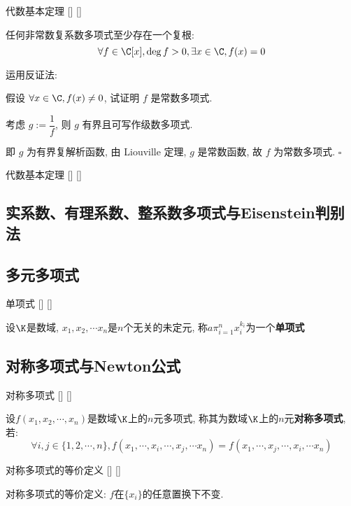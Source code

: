 \documentclass[UTF8]{ctexart}
\begin{document}
		\begin{thm}
			[]
			{代数基本定理}
			[]
			[]

			任何非常数复系数多项式至少存在一个复根: 
			\[\forall f\in\C[x], \deg f>0, \exists x\in\C, f(x)=0\]
		\end{thm}

		\begin{prf}
			运用反证法: 

			假设 \(\forall x\in\C, f(x)\neq 0\), 试证明 \(f\) 是常数多项式. 

			考虑 \(g:=\dfrac{1}{f}\), 则 \(g\) 有界且可写作级数多项式. 

			即 \(g\) 为有界复解析函数, 由 Liouville 定理, \(g\) 是常数函数, 故 \(f\) 为常数多项式. \(\square\)
		\end{prf}
	
		\begin{thm}
			[]
			{代数基本定理}
			[]
			[]


		\end{thm}
	
	\subsection{实系数、有理系数、整系数多项式与Eisenstein判别法}
	
	\subsection{多元多项式}
	
		\begin{dfn}
			[]
			{单项式}
			[]
			[]

			设$\K$是数域, $x_1,x_2,\cdots x_n$是$n$个无关的未定元, 称$a\pi_{i=1}^n x_i^{k_i}$为一个\textbf{单项式}
		\end{dfn}
	
	\subsection{对称多项式与Newton公式}

		\begin{dfn}
			[]
			{对称多项式}
			[]
			[]

			设$f(x_1,x_2,\cdots,x_n)$是数域$\K$上的$n$元多项式, 称其为数域$\K$上的$n$元\textbf{对称多项式}, 若: 
			\[\forall i,j\in\{1,2,\cdots,n\}, f(x_1,\cdots,x_i,\cdots,x_j,\cdots x_n)=f(x_1,\cdots,x_j,\cdots,x_i,\cdots x_n)\]
		\end{dfn}

		\begin{ppt}
			[]
			{对称多项式的等价定义}
			[]
			[]

			对称多项式的等价定义: $f$在$\{x_i\}$的任意置换下不变. 
		\end{ppt}
		
\end{document}
